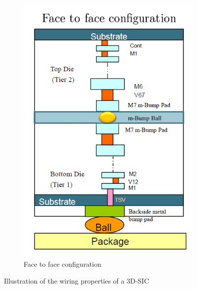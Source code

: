 \begin{figure}[h!]
\begin{subfigure}{0.5\textwidth}
\begin{center}
	\includegraphics[width=\textwidth]{facetoface}
	\caption{Face to face configuration}
	\label{fig:facetoface}
	\end{center}
\end{subfigure}
\caption{Illustration of the wiring properties of a 3D-SIC \cite{noice2010}}
\label{fig:3D_SIC_SOC2010}
\end{figure}

